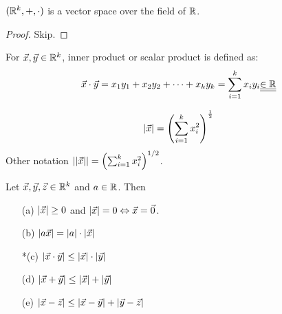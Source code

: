 \documentclass[]{article}
\begin{document}
\begin{theorem}
	$(\mathbb{R}^k,+,\cdot)$ is a vector space over the field of $\mathbb{R}$.
\end{theorem}
\begin{proof}
	Skip.
\end{proof}
\begin{definition}
	For $\vec{x},\vec{y}\in\mathbb{R}^k$, inner product or scalar product is defined as:
	$$ \vec{x}\cdot\vec{y} = x_1y_1+x_2y_2+\dots+x_ky_k = \sum_{i=1}^k x_iy_i\underline{\underline{\in\mathbb{R}}}$$
\end{definition}
\begin{definition}
	$$ |\vec{x}| = \left( \sum_{i=1}^k x_i^2 \right)^\frac{1}{2}$$
	Other notation $||\vec{x}|| = \left( \sum_{i=1}^k x_i^2 \right)^{1/2}$.
\end{definition}
\begin{theorem}
	Let $\vec{x},\vec{y},\vec{z}\in\mathbb{R}^k$ and $a\in\mathbb{R}$. Then
	\begin{enumerate}
		\item[(a)] $|\vec{x}|\geq 0$ and $|\vec{x}| = 0 \Leftrightarrow \vec{x} = \vec{0}$.
		\item[(b)] $|a\vec{x}| = |a|\cdot|\vec{x}|$
		\item[*(c)] $|\vec{x}\cdot\vec{y}| \leq |\vec{x}|\cdot |\vec{y}|$
		\item[(d)] $|\vec{x}+\vec{y}| \leq |\vec{x}|+|\vec{y}|$
		\item[(e)] $|\vec{x} - \vec{z}| \leq |\vec{x} - \vec{y}| + |\vec{y}-\vec{z}|$
	\end{enumerate}
\end{theorem}
\end{document}
